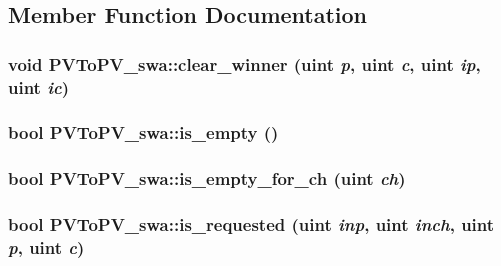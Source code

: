 \subsection{Member Function Documentation}
\hypertarget{classPVToPV__swa_16391cc301306acef66eff1ab847c7ca}{
\subsubsection[{clear\_\-winner}]{\setlength{\rightskip}{0pt plus 5cm}void PVToPV\_\-swa::clear\_\-winner ({\bf uint} {\em p}, \/  {\bf uint} {\em c}, \/  {\bf uint} {\em ip}, \/  {\bf uint} {\em ic})}}
\label{classPVToPV__swa_16391cc301306acef66eff1ab847c7ca}


\hypertarget{classPVToPV__swa_2c5f9c5a78aa05ab166b58d04738081d}{
\subsubsection[{is\_\-empty}]{\setlength{\rightskip}{0pt plus 5cm}bool PVToPV\_\-swa::is\_\-empty ()}}
\label{classPVToPV__swa_2c5f9c5a78aa05ab166b58d04738081d}


\hypertarget{classPVToPV__swa_131c0ee2c54b76f6c10858889104edb4}{
\subsubsection[{is\_\-empty\_\-for\_\-ch}]{\setlength{\rightskip}{0pt plus 5cm}bool PVToPV\_\-swa::is\_\-empty\_\-for\_\-ch ({\bf uint} {\em ch})}}
\label{classPVToPV__swa_131c0ee2c54b76f6c10858889104edb4}


\hypertarget{classPVToPV__swa_bc1410b2178d02ce2bacba66707e1b1e}{
\subsubsection[{is\_\-requested}]{\setlength{\rightskip}{0pt plus 5cm}bool PVToPV\_\-swa::is\_\-requested ({\bf uint} {\em inp}, \/  {\bf uint} {\em inch}, \/  {\bf uint} {\em p}, \/  {\bf uint} {\em c})}}
\label{classPVToPV__swa_bc1410b2178d02ce2bacba66707e1b1e}


